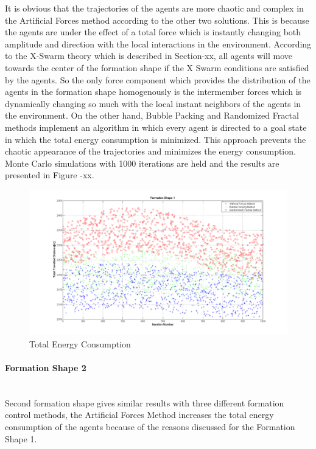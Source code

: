 \documentclass[twoside]{article}
\begin{document}
		It is obvious that the trajectories of the agents are more chaotic and complex in the Artificial Forces method according to the other two solutions. This is because the agents are under the effect of a total force which is instantly changing both amplitude and direction with the local interactions in the environment. According to the X-Swarm theory which is described in Section-xx, all agents will move towards the center of the formation shape if the X Swarm conditions are satisfied by the agents. So the only force component which provides the distribution of the agents in the formation shape homogenously is the intermember forces which is dynamically changing so much with the local instant neighbors of the agents in the environment. On the other hand, Bubble Packing and Randomized Fractal methods implement an algorithm in which every agent is directed to a goal state in which the total energy consumption is minimized. This approach prevents the chaotic appearance of the trajectories and minimizes the energy consumption.
		Monte Carlo simulations with 1000 iterations are held and the results are presented in Figure -xx. 
		
		\begin{figure}[H]
			\caption{Total Energy Consumption}
			\centerline{\includegraphics[scale = 0.35]{Total_Energy_Shape_1}}
		\end{figure} 	
		
		
		
		
		   \paragraph{Formation Shape 2}\hspace{0pt} \\
Second formation shape gives similar results with three different formation control methods, the Artificial Forces Method increases the total energy consumption of the agents because of the reasons discussed for the Formation Shape 1.
\end{document}
